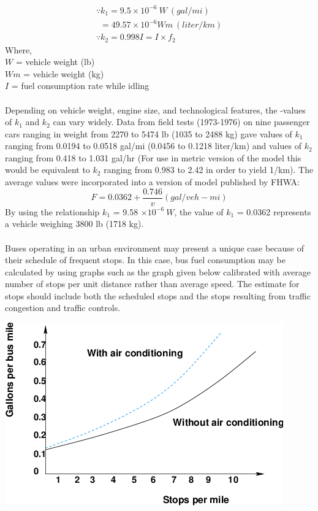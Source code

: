\begin{gather}
	\because k_1 = 9.5\times 10^{-6} \: W \: (gal/mi)\\
	\: \: = 49.57 \times 10^{-6} Wm \: (liter/km)\\
	\because k_2 = 0.998 I = I \times f_2
\end{gather}
Where,\\
\hspace*{10mm} $ W $ = vehicle weight (lb)\\
\hspace*{10mm} $ Wm $ = vehicle weight (kg)\\
\hspace*{10mm} $ I $ = fuel consumption rate while idling\\\\
Depending on vehicle weight, engine size, and technological features, the -values of $ k_1 $ and $ k_2 $ can vary widely. Data from field tests (1973-1976) on nine passenger cars ranging in weight from 2270 to 5474 lb (1035 to 2488 kg) gave values of $ k_1 $ ranging from 0.0194 to 0.0518 gal/mi (0.0456 to 0.1218 liter/km) and values of $ k_2 $ ranging from 0.418 to 1.031 gal/hr (For use in metric version of the model this would be equivalent to $ k_2 $ ranging from 0.983 to 2.42 in order to yield 1/km). The average values were incorporated into a version of model published by FHWA:
\begin{equation}
	F = 0.0362 + \frac{0.746}{v} (gal/veh-mi)
\end{equation}
By using the relationship $ k_1 $ = 9.58 $ \times 10^{-6} \:W$, the value of $ k_1 $ = 0.0362 represents a vehicle weighing 3800 lb (1718 kg).\\\\
Buses operating in an urban environment may present a unique case because of their schedule of frequent stops. In this case, bus fuel consumption may be calculated by using graphs such as the graph given below calibrated with average number of stops per unit distance rather than average speed. The estimate for stops should include both the scheduled stops and the stops resulting from traffic congestion and traffic controls.
\begin{center}
	\includegraphics[scale=0.8]{gfx/fig55.png}
\end{center}
